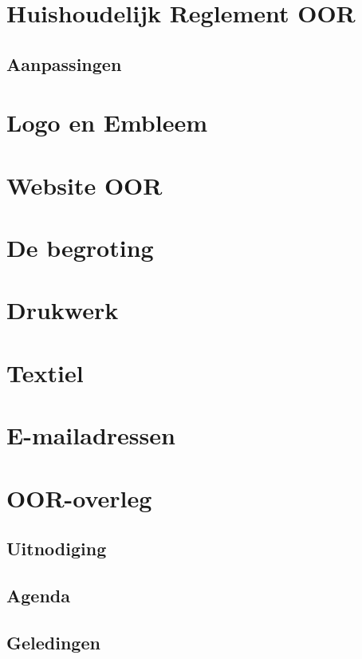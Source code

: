 \documentclass[a4paper,11pt]{article}
\begin{document}
	\section{Huishoudelijk Reglement OOR}
	
		\subsection{Aanpassingen}
	
	\section{Logo en Embleem}
	
	\section{Website OOR}
	
	\section{De begroting}
	\label{begroting}
	
	\section{Drukwerk}
	\label{drukwerk}
	
	\section{Textiel}
	
	\section{E-mailadressen}
	
	\section{OOR-overleg}
	
		\subsection{Uitnodiging}
	
		\subsection{Agenda}
		
		\subsection{Geledingen}
		
\end{document}
